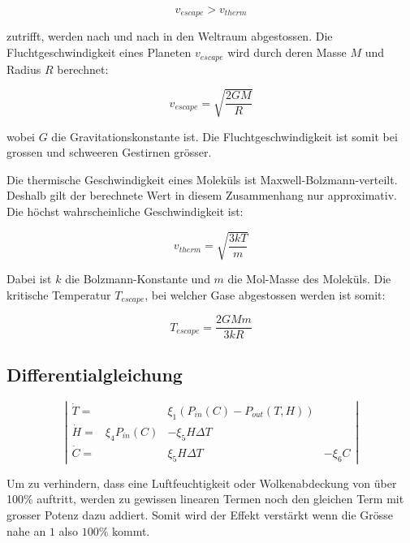 \begin{refsection}

\begin{equation}
v_{escape} > v_{therm}
\end{equation}

zutrifft, werden nach und nach in den Weltraum abgestossen.
Die Fluchtgeschwindigkeit eines Planeten $v_{escape}$ wird durch deren Masse $M$ und Radius $R$ berechnet: 

\begin{equation}
v_{escape} = \sqrt{\frac{2GM}{R}}
\end{equation}

wobei $G$ die Gravitationskonstante ist. Die Fluchtgeschwindigkeit ist somit bei grossen und schweeren Gestirnen grösser.

Die thermische Geschwindigkeit eines Moleküls ist Maxwell-Bolzmann-verteilt. Deshalb gilt der berechnete Wert in diesem Zusammenhang nur approximativ. Die höchst wahrscheinliche Geschwindigkeit ist: 

\begin{equation}
v_{therm} = \sqrt{\frac{3kT}{m}}
\end{equation}

Dabei ist $k$ die Bolzmann-Konstante und $m$ die Mol-Masse des Moleküls. Die kritische Temperatur $T_{escape}$, bei welcher Gase abgestossen werden ist somit:

\begin{equation}
T_{escape} = \frac{2GMm}{3kR}
\end{equation}

\subsection{Differentialgleichung}

\begin{equation}
\left|
\begin{matrix}
\dot{T} = &  & \xi_1 \left(P_{in}(C) - P_{out}(T, H) \right) &\\
\dot{H} = & \xi_4 P_{in}(C) & - \xi_5 H \Delta T & \\
\dot{C} = &                 &   \xi_5 H \Delta T & - \xi_6 C
\end{matrix}
\right|
\end{equation}

Um zu verhindern, dass eine Luftfeuchtigkeit oder Wolkenabdeckung von über 100\% auftritt, werden zu gewissen linearen Termen noch den gleichen Term mit grosser Potenz dazu addiert. Somit wird der Effekt verstärkt wenn die Grösse nahe an $1$ also $100\%$ kommt.  


\end{refsection}
